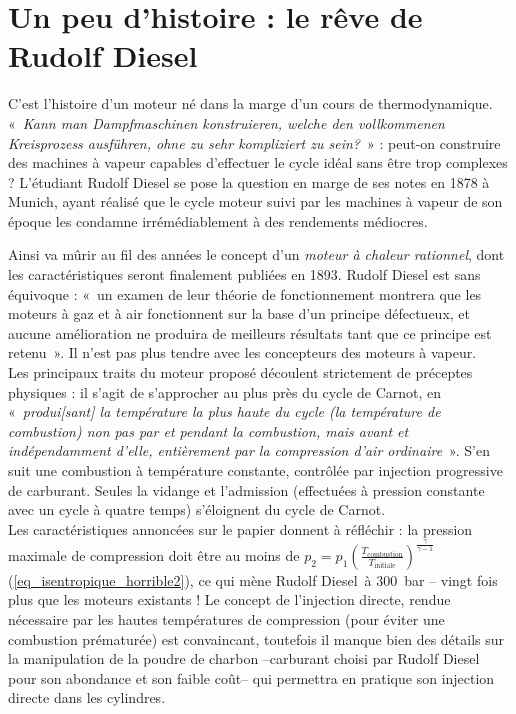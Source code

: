 \atstartofhistorysection
\section[Un peu d’histoire : le rêve de Rudolf Diesel]{Un peu d’histoire :\onlyamphibook{\\} le rêve de Rudolf Diesel}
\label{ch_histoire_diesel}

	C’est l’histoire d’un moteur né dans la marge d’un cours de thermodynamique. «~\textit{Kann man Dampfmaschinen konstruieren, welche den vollkommenen Kreisprozess ausführen, ohne zu sehr kompliziert zu sein?}~» : peut-on construire des machines à vapeur capables d’effectuer le cycle idéal sans être trop complexes ? L’étudiant \mbox{Rudolf} Diesel se pose la question en marge de ses notes en 1878 à Munich, ayant réalisé que le cycle moteur suivi par les machines à vapeur de son époque les condamne irrémédiablement à des rendements médiocres.

	Ainsi va mûrir au fil des années le concept d’un \textit{moteur à chaleur rationnel}, dont les caractéristiques seront finalement publiées en 1893. %
	Rudolf Diesel est sans équivoque : «~un examen de leur théorie de fonctionnement montrera que les moteurs à gaz et à air fonctionnent sur la base d’un principe défectueux, et aucune amélioration ne produira de meilleurs résultats tant que ce principe est retenu~». Il n’est pas plus tendre avec les concepteurs des moteurs à vapeur.\\
	Les principaux traits du moteur proposé découlent strictement de préceptes physiques : il s’agit de s’approcher au plus près du cycle de Carnot, en «~\textit{produi[sant] la température la plus haute du cycle (la température de combustion) non pas par et pendant la combustion, mais avant et indépendamment d’elle, entièrement par la compression d’air ordinaire}~». S’en suit une combustion à température constante, contrôlée par injection progressive de carburant. Seules la vidange et l’admission (effectuées à pression constante avec un cycle à quatre temps) s’éloignent du cycle de Carnot.\\
	Les caractéristiques annoncées sur le papier donnent à réfléchir : la pression maximale de compression doit être au moins de $p_2 = p_1 \left( \frac{T_\text{combustion}}{T_\text{initiale}} \right)^{\frac{\gamma}{\gamma -1}}$ (\ref{eq_isentropique_horrible2}), ce qui mène Rudolf Diesel~à \SI{300}{\bar} -- vingt fois plus que les moteurs existants ! Le concept de l’injection directe, rendue nécessaire par les hautes températures de compression (pour éviter une combustion prématurée) est convaincant, toutefois il manque bien des détails sur la manipulation de la poudre de charbon --carburant choisi par Rudolf Diesel pour son abondance et son faible coût-- qui permettra en pratique son injection directe dans les cylindres.

